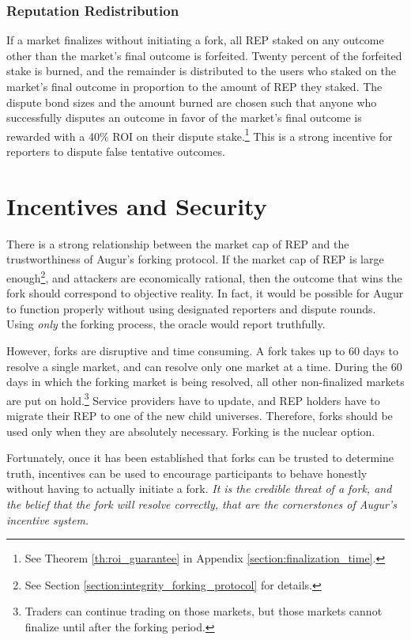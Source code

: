 \documentclass[floatfix,reprint,nofootinbib,amsmath,amssymb,epsfig,pre,floats,letterpaper,groupedaffiliation]{revtex4-1}
\theoremstyle{definition}
\theoremstyle{definition}
\begin{document}
\subsubsection{Reputation Redistribution}\label{section:rep_redistribution}

If a market finalizes without initiating a fork, all REP staked on any outcome other than the market's final outcome is forfeited. Twenty percent of the forfeited stake is burned, and the remainder is distributed to the users who staked on the market's final outcome in proportion to the amount of REP they staked.  The dispute bond sizes and the amount burned are chosen such that anyone who successfully disputes an outcome in favor of the market's final outcome is rewarded with a 40\% ROI on their dispute stake.\footnote{See Theorem \ref{th:roi_guarantee} in Appendix \ref{section:finalization_time}.}  This is a strong incentive for reporters to dispute false tentative outcomes.


\section{Incentives and Security}\label{section:incentives_and_security}

There is a strong relationship between the market cap of REP and the trustworthiness of Augur's forking protocol.  If the market cap of REP is large enough\footnote{See Section \ref{section:integrity_forking_protocol} for details.}, and attackers are economically rational, then the outcome that wins the fork should correspond to objective reality.  In fact, it would be possible for Augur to function properly without using designated reporters and dispute rounds.  Using \textit{only} the forking process, the oracle would report truthfully.

However, forks are disruptive and time consuming.  A fork takes up to 60 days to resolve a single market, and can resolve only one market at a time.  During the 60 days in which the forking market is being resolved, all other non-finalized markets are put on hold.\footnote{Traders can continue trading on those markets, but those markets cannot finalize until after the forking period.}  Service providers have to update, and REP holders have to migrate their REP to one of the new child universes.  Therefore, forks should be used only when they are absolutely necessary.  Forking is the nuclear option.

Fortunately, once it has been established that forks can be trusted to determine truth, incentives can be used to encourage participants to behave honestly without having to actually initiate a fork.  \textit{It is the credible threat of a fork, and the belief that the fork will resolve correctly, that are the cornerstones of Augur's incentive system.}
\end{document}
